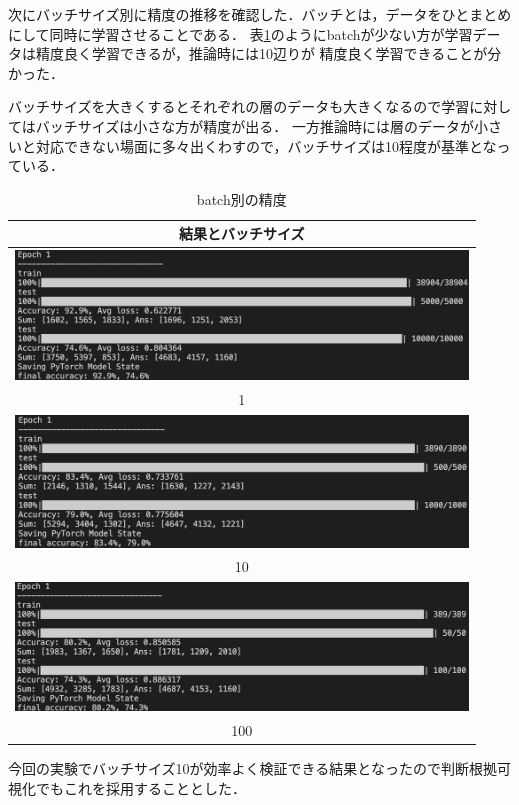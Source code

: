 次にバッチサイズ別に精度の推移を確認した．バッチとは，データをひとまとめにして同時に学習させることである．
表\ref{batch}のようにbatchが少ない方が学習データは精度良く学習できるが，推論時には10辺りが
精度良く学習できることが分かった．

バッチサイズを大きくするとそれぞれの層のデータも大きくなるので学習に対してはバッチサイズは小さな方が精度が出る．
一方推論時には層のデータが小さいと対応できない場面に多々出くわすので，バッチサイズは10程度が基準となっている．

\begin{table}[b]
  \centering
  \begin{tabular}{|c|} \hline
    結果とバッチサイズ \\ \hline
    \includegraphics[width=120mm]{images/net_result/batch1.png}
    \\ 1 \\ \hline
    \includegraphics[width=120mm]{images/net_result/batch10.png}
    \\ 10 \\ \hline
    \includegraphics[width=120mm]{images/net_result/batch100.png}
    \\ 100 \\ \hline
  \end{tabular}
  \caption{batch別の精度}
  \label{batch}
\end{table}
\clearpage

今回の実験でバッチサイズ10が効率よく検証できる結果となったので判断根拠可視化でもこれを採用することとした．

